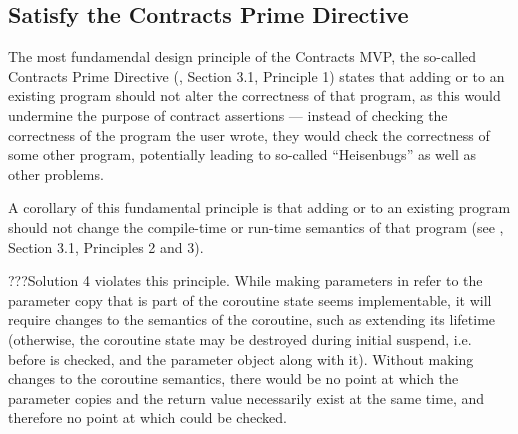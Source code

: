 

\subsection{Satisfy the Contracts Prime Directive}
\label{goal_prime_directive}

The most fundamendal design principle of the Contracts MVP, the so-called Contracts Prime Directive (\cite{P2900R8}, Section 3.1, Principle 1) states that adding  or  to an existing program should not alter the correctness of that program, as this would undermine the purpose of contract assertions --- instead of checking the correctness of the program the user wrote, they would check the correctness of some other program, potentially leading to so-called ``Heisenbugs'' as well as other problems.

A corollary of this fundamental principle is that adding  or  to an existing program should not change the compile-time or run-time semantics of that program (see \cite{P2900R8}, Section 3.1, Principles 2 and 3).

???Solution 4 violates this principle. While making parameters in  refer to the parameter copy that is part of the coroutine state seems implementable, it will require changes to the semantics of the coroutine, such as extending its lifetime (otherwise, the coroutine state may be destroyed during initial suspend, i.e. before  is checked, and the parameter object along with it). Without making changes to the coroutine semantics, there would be no point at which the parameter copies and the return value necessarily exist at the same time, and therefore no point at which  could be checked.


